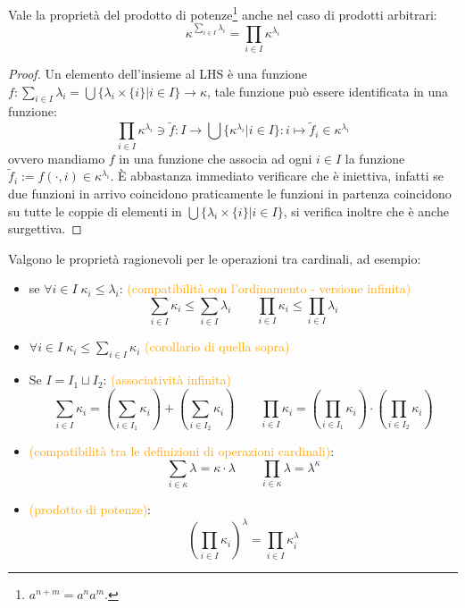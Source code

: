 \begin{remark}
	Vale la proprietà del prodotto di potenze\footnote{$a^{n+m} = a^na^m$.} anche nel caso di prodotti arbitrari:
	\[ \kappa^{\sum_{i \in I}\lambda_i} = \prod_{i \in I} \kappa^{\lambda_i}
		\]
\end{remark}

\begin{proof}
	Un elemento dell'insieme al LHS è una funzione $f : \sum_{i \in I} \lambda_i = \bigcup\{\lambda_i \times \{i\} | i \in I\} \rightarrow \kappa$,
	tale funzione può essere identificata in una funzione:
	\[ \prod_{i \in I}\kappa^{\lambda_i}\ni\widetilde{f} : I \rightarrow \bigcup\{\kappa^{\lambda_i} | i \in I\} : i \mapsto \widetilde{f}_i \in \kappa^{\lambda_i}
		\]
	ovvero mandiamo $f$ in una funzione che associa ad ogni $i \in I$ la funzione $\widetilde{f}_i := f(\cdot,i) \in \kappa^{\lambda_i}$. È abbastanza immediato verificare che è iniettiva, infatti se due funzioni in arrivo coincidono praticamente le funzioni in partenza coincidono su tutte le coppie di elementi 
	in $\bigcup\{\lambda_i \times \{i\} | i \in I\}$, si verifica inoltre che è anche surgettiva.
\end{proof}

\begin{exercise}
	Valgono le proprietà ragionevoli per le operazioni tra cardinali, ad esempio:
	\begin{itemize}
		\item se $\forall i \in I \; \kappa_i \leq \lambda_i$: \textcolor{orange}{(compatibilità con l'ordinamento - versione infinita)}
		\[ \sum_{i \in I} \kappa_i \leq \sum_{i \in I} \lambda_i \qquad \prod_{i \in I} \kappa_i \leq \prod_{i \in I} \lambda_i
			\]
		\item $\forall i \in I \; \kappa_i \leq \sum_{i \in I} \kappa_i$ \textcolor{orange}{(corollario di quella sopra)}
		\item Se $I = I_1 \sqcup I_2$: \textcolor{orange}{(associatività infinita)}
		\[ \sum_{i \in I} \kappa_i = \left(\sum_{i \in I_1} \kappa_i\right) + \left(\sum_{i \in I_2} \kappa_i\right) \qquad \prod_{i \in I}\kappa_i = \left(\prod_{i \in I_1} \kappa_i\right)\cdot\left(\prod_{i \in I_2} \kappa_i\right)
			\]
		\item \textcolor{orange}{(compatibilità tra le definizioni di operazioni cardinali)}:
		\[ \sum_{i \in \kappa} \lambda = \kappa \cdot \lambda \qquad \prod_{i \in \kappa} \lambda = \lambda^\kappa
			\]
		\item \textcolor{orange}{(prodotto di potenze)}:
		\[ \left(\prod_{i \in I}\kappa_i\right)^\lambda = \prod_{i \in I} \kappa_i^\lambda
			\]
	\end{itemize}
\end{exercise}


